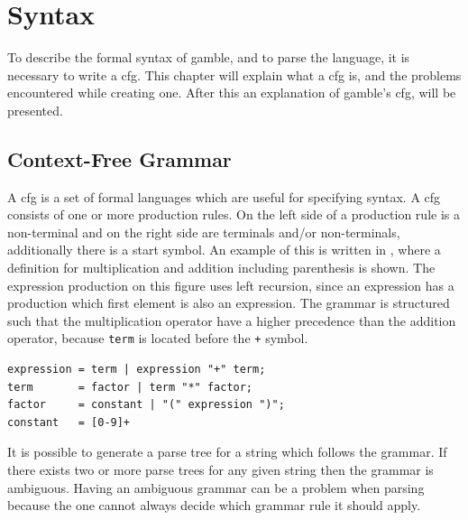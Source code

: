 \chapter{Syntax}\label{chap:syntax}

To describe the formal syntax of \gls{gamble}, and to parse the language, it is necessary to write a \acrfull{cfg}.
This chapter will explain what a \acrshort{cfg} is, and the problems encountered while creating one.
After this an explanation of \gls{gamble}'s \acrshort{cfg}, will be presented.

\section{Context-Free Grammar}\label{sec:cfg}
A \acrshort{cfg} is a set of formal languages which are useful for specifying syntax. 
A \acrshort{cfg} consists of one or more production rules.
On the left side of a production rule is a non-terminal and on the right side are terminals and/or non-terminals, additionally there is a start symbol.
An example of this is written in , where a definition for multiplication and addition including parenthesis is shown.
The expression production on this figure uses left recursion, since an expression has a production which first element is also an expression.
The grammar is structured such that the multiplication operator have a higher precedence than the addition operator, because \texttt{term} is located before the \texttt{+} symbol.

\begin{lstlisting}[caption={An example of a \acrshort{cfg} written in \acrshort{ebnf}, with \acrshort{regex} for defining numbers. },frame=tlrb,label={lst:cfglst1},numbers=none]
expression = term | expression "+" term;
term       = factor | term "*" factor;
factor     = constant | "(" expression ")";
constant   = [0-9]+
\end{lstlisting}

It is possible to generate a parse tree for a string which follows the grammar. 
If there exists two or more parse trees for any given string then the grammar is ambiguous. 
Having an ambiguous grammar can be a problem when parsing because the one cannot always decide which grammar rule it should apply. 

